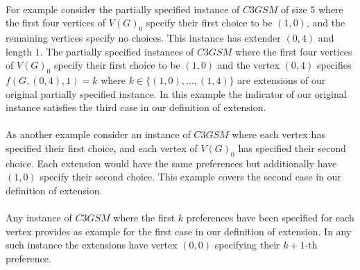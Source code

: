 \paragraph{}
For example consider the partially specified instance of $C3GSM$ of size $5$ where the first four vertices of $V(G)_0$ specify their first choice to be $(1,0)$, and the remaining vertices specify no choices. This instance has extender $(0,4)$ and length $1$. The partially specified instances of $C3GSM$ where the first four vertices of $V(G)_0$ specify their first choice to be $(1,0)$ and the vertex $(0,4)$ specifies $f(G,(0,4),1) = k$ where $k \in \{(1,0), \dots, (1,4)\}$ are extensions of our original partially specified instance. In this example the indicator of our original instance satisfies the third case in our definition of extension. 
\paragraph{}
As another example consider an instance of $C3GSM$ where each vertex has specified their first choice, and each vertex of $V(G)_0$ has specified their second choice. Each extension would have the same preferences but additionally have $(1,0)$ specify their second choice. This example covers the second case in our definition of extension. 
\paragraph{}
Any instance of $C3GSM$ where the first $k$ preferences have been specified for each vertex provides as example for the first case in our definition of extension. In any such instance the extensions have vertex $(0,0)$ specifying their $k+1$-th preference.
